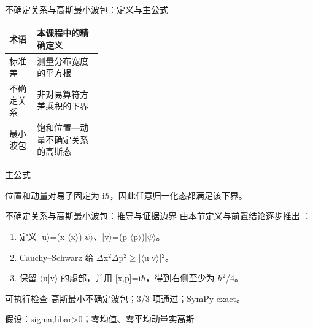 \begin{frame}[t]{不确定关系与高斯最小波包：定义与主公式}
\footnotesize\begin{tabularx}{\linewidth}{p{0.30\linewidth}Y}
\toprule 术语 & 本课程中的精确定义\\\midrule
{} 标准差 & 测量分布宽度的平方根\\
 不确定关系 & 非对易算符方差乘积的下界\\
 最小波包 & 饱和位置—动量不确定关系的高斯态\\
\bottomrule\end{tabularx}\vspace{0.15cm}
\begin{block}{ 主公式}\centering{}\end{block}
位置和动量对易子固定为 i\ensuremath{\hbar}，因此任意归一化态都满足该下界。
\end{frame}

\begin{frame}[t]{不确定关系与高斯最小波包：推导与证据边界}
\footnotesize
{}\quad 由本节定义与前置结论逐步推出 ：
\begin{enumerate}
\item 定义 |u\ensuremath{\rangle}=(x-\ensuremath{\langle}x\ensuremath{\rangle})|\ensuremath{\psi}\ensuremath{\rangle}、|v\ensuremath{\rangle}=(p-\ensuremath{\langle}p\ensuremath{\rangle})|\ensuremath{\psi}\ensuremath{\rangle}。
\item Cauchy--Schwarz 给 \ensuremath{\Delta}x\ensuremath{^{2}}\ensuremath{\Delta}p\ensuremath{^{2}}\ensuremath{\ge}|\ensuremath{\langle}u|v\ensuremath{\rangle}|\ensuremath{^{2}}。
\item 保留 \ensuremath{\langle}u|v\ensuremath{\rangle} 的虚部，并用 [x,p]=i\ensuremath{\hbar}，得到右侧至少为 \ensuremath{\hbar}\ensuremath{^{2}}/\allowbreak{}4。
\end{enumerate}\begin{block}{可执行检查}
\quad 高斯最小不确定波包；3/3 项通过；SymPy exact。
\par\scriptsize 假设：sigma,hbar>0；零均值、零平均动量实高斯
\end{block}
\end{frame}

